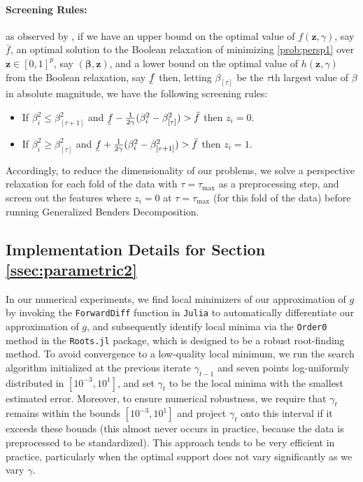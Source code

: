 \documentclass[ijoc,noblindrev]{informs3} %
\begin{document}
\paragraph{Screening Rules:} as observed by \cite{atamturk2020safe}, if we have an upper bound on the optimal value of $f(\bm{z}, \gamma)$, say $\bar{f}$, 
an optimal solution to the Boolean relaxation of minimizing \eqref{prob:persp1} over $\bm{z} \in [0, 1]^p$, say $(\bm{\beta}, \bm{z})$, and a lower bound on the optimal value of $h(\bm{z}, \gamma)$ from the Boolean relaxation, say $\underaccent{\bar}{f}$
then, letting $\beta_{[\tau]}$ be the $\tau$th largest value of $\beta$ in absolute magnitude, we have the following screening rules:
    \begin{itemize}
        \item If $\beta_i^2 \leq \beta_{[\tau+1]}^2$ and $\underaccent{\bar}{f}-\frac{1}{2\gamma}(\beta^2_{i}-\beta^2_{[\tau]})>\bar{f}$ then $z_i=0$.
        \item If $\beta_i^2 \geq \beta_{[\tau]}^2$ and $\underaccent{\bar}{f}+\frac{1}{2\gamma}(\beta_{i}^2-\beta^2_{[\tau+1]})>\bar{f}$ then $z_i=1$.
    \end{itemize}
Accordingly, to reduce the dimensionality of our problems, we solve a perspective relaxation for each fold of the data with $\tau=\tau_{\max}$ as a preprocessing step, and screen out the features where $z_i=0$ at $\tau=\tau_{\max}$ (for this fold of the data) before running Generalized Benders Decomposition.

\subsection{Implementation Details for Section \ref{ssec:parametric2}}\label{append.4.2}
In our numerical experiments, we find local minimizers of our approximation of $g$ by invoking the \verb|ForwardDiff| function in \verb|Julia| to automatically differentiate our approximation of $g$, and subsequently identify local minima via the \verb|Order0| method in the \verb|Roots.jl| package, which is designed to be a robust root-finding method. To avoid convergence to a low-quality local minimum, we run the search algorithm initialized at the previous iterate $\gamma_{t-1}$ and seven points log-uniformly distributed in $[10^{-3}, 10^{1}]$, and set $\gamma_t$ to be the local minima with the smallest estimated error. Moreover, to ensure numerical robustness, we require that $\gamma_t$ remains within the bounds $[10^{-3}, 10^1]$ and project $\gamma_t$ onto this interval if it exceeds these bounds (this almost never occurs in practice, because the data is preprocessed to be standardized). This approach tends to be very efficient in practice, particularly when the optimal support does not vary significantly as we vary $\gamma$. 
\end{document}
